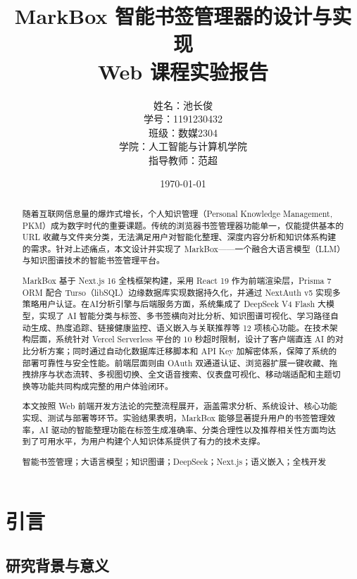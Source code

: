 \documentclass[12pt,a4paper]{ctexart}
\title{{\bfseries MarkBox 智能书签管理器的设计与实现}\\[6pt]
  \large Web 课程实验报告}
\author{
  \begin{tabular}{rl}
    姓名：& 池长俊 \\
    学号：& 1191230432 \\
    班级：& 数媒2304 \\
    学院：& 人工智能与计算机学院 \\
    指导教师：& 范超
  \end{tabular}
}
\date{\today}
\begin{document}
\maketitle
\thispagestyle{empty}

\begin{abstract}
\noindent
随着互联网信息量的爆炸式增长，个人知识管理（Personal Knowledge Management, PKM）成为数字时代的重要课题。传统的浏览器书签管理器功能单一，仅能提供基本的 URL 收藏与文件夹分类，无法满足用户对智能化整理、深度内容分析和知识体系构建的需求。针对上述痛点，本文设计并实现了 MarkBox——一个融合大语言模型（LLM）与知识图谱技术的智能书签管理平台。

MarkBox 基于 Next.js 16 全栈框架构建，采用 React 19 作为前端渲染层，Prisma 7 ORM 配合 Turso（libSQL）边缘数据库实现数据持久化，并通过 NextAuth v5 实现多策略用户认证。在AI分析引擎与后端服务方面，系统集成了 DeepSeek V4 Flash 大模型，实现了 AI 智能分类与标签、多书签横向对比分析、知识图谱可视化、学习路径自动生成、热度追踪、链接健康监控、语义嵌入与关联推荐等 12 项核心功能。在技术架构层面，系统针对 Vercel Serverless 平台的 10 秒超时限制，设计了客户端直连 AI 的对比分析方案；同时通过自动化数据库迁移脚本和 API Key 加解密体系，保障了系统的部署可靠性与安全性能。前端层面则由 OAuth 双通道认证、浏览器扩展一键收藏、拖拽排序与状态流转、多视图切换、全文语音搜索、仪表盘可视化、移动端适配和主题切换等功能共同构成完整的用户体验闭环。

本文按照 Web 前端开发方法论的完整流程展开，涵盖需求分析、系统设计、核心功能实现、测试与部署等环节。实验结果表明，MarkBox 能够显著提升用户的书签管理效率，AI 驱动的智能整理功能在标签生成准确率、分类合理性以及推荐相关性方面均达到了可用水平，为用户构建个人知识体系提供了有力的技术支撑。

\medskip
{} 智能书签管理；大语言模型；知识图谱；DeepSeek；Next.js；语义嵌入；全栈开发
\end{abstract}

\newpage
\tableofcontents
\newpage

\section{引言}

\subsection{研究背景与意义}
\end{document}
